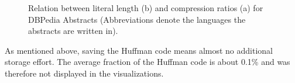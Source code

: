 \begin{figure}[h]
	\centering
	\hfill
	\caption{Relation between literal length (b) and compression ratios (a) for DBPedia Abstracts (Abbreviations denote the languages the abstracts are written in).}
	\label{fig:dbAbstracts}
\end{figure}

As mentioned above, saving the Huffman code means almost no additional storage effort. The average fraction of the Huffman code is about 0.1\% and was therefore not displayed in the visualizations.

